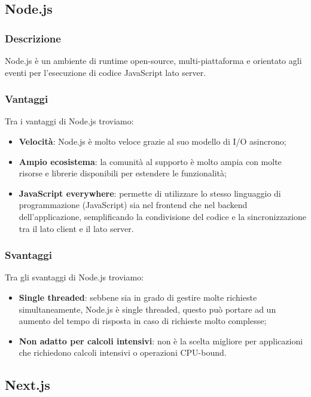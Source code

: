 \subsection*{Node.js}

\subsubsection*{Descrizione}
Node.js è un ambiente di runtime open-source, multi-piattaforma e orientato agli eventi per l'esecuzione di codice JavaScript lato server.

\subsubsection*{Vantaggi}
Tra i vantaggi di Node.js troviamo:
\begin{itemize}
    \item \textbf{Velocità}: Node.js è molto veloce grazie al suo modello di I/O asincrono;
    \item \textbf{Ampio ecosistema}: la comunità al supporto è molto ampia con molte risorse e librerie disponibili per estendere le funzionalità;
    \item \textbf{JavaScript everywhere}: permette di utilizzare lo stesso linguaggio di programmazione (JavaScript) sia nel frontend che nel backend dell'applicazione, semplificando la condivisione del codice e la sincronizzazione tra il lato client e il lato server.
\end{itemize}

\subsubsection*{Svantaggi}
Tra gli svantaggi di Node.js troviamo:
\begin{itemize}
    \item \textbf{Single threaded}: sebbene sia in grado di gestire molte richieste simultaneamente, Node.js è single threaded, questo può portare ad un aumento del tempo di risposta in caso di richieste molto complesse;
    \item \textbf{Non adatto per calcoli intensivi}: non è la scelta migliore per applicazioni che richiedono calcoli intensivi o operazioni CPU-bound.
\end{itemize}


\subsection*{Next.js}


